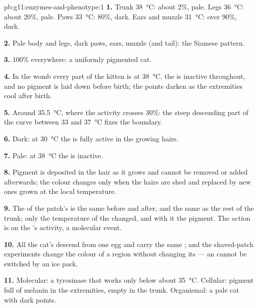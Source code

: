 \begin{solution}{pb:g11:enzymes-and-phenotype:1}
\textbf{1.} Trunk \qty{38}{\celsius}: about 2\%, pale. Legs
\qty{36}{\celsius}: about 20\%, pale. Paws \qty{33}{\celsius}: 80\%,
dark. Ears and muzzle \qty{31}{\celsius}: over 90\%, dark.

\textbf{2.} Pale body and legs, dark paws, ears, muzzle (and tail):
the Siamese pattern.

\textbf{3.} 100\% everywhere: a uniformly pigmented cat.

\textbf{4.} In the womb every part of the kitten is at
\qty{38}{\celsius}, the  is inactive throughout, and no pigment
is laid down before birth; the points darken as the extremities cool
after birth.

\textbf{5.} Around \qty{35.5}{\celsius}, where the activity crosses
30\%: the steep descending part of the curve between 33 and
\qty{37}{\celsius} fixes the boundary.

\textbf{6.} Dark: at \qty{30}{\celsius} the  is fully active in
the growing hairs.

\textbf{7.} Pale: at \qty{38}{\celsius} the  is inactive.

\textbf{8.} Pigment is deposited in the hair as it grows and cannot be
removed or added afterwards; the colour changes only when the hairs
are shed and replaced by new ones grown at the local temperature.

\textbf{9.} The  of the patch's  is the same before and
after, and the same as the rest of the trunk; only the temperature of
the  changed, and with it the pigment. The action is on the
's activity, a molecular event.

\textbf{10.} All the cat's  descend from one egg and carry the
same ; and the shaved-patch experiments change the colour of a
region without changing its  --- an  cannot be switched by
an ice pack.

\textbf{11.} Molecular: a tyrosinase that works only below about
\qty{35}{\celsius}. Cellular: pigment  full of melanin in the
extremities, empty in the trunk. Organismal: a pale cat with dark
points.


\end{solution}
